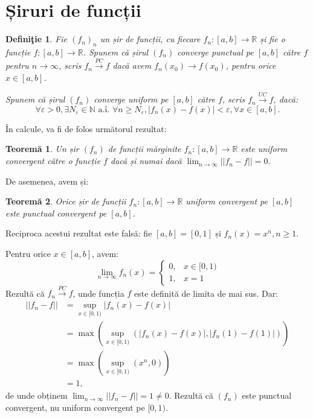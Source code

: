 \documentclass[11pt,a4paper]{article}
\newcommand\ds{\displaystyle}
\newcommand\xrar{\xrightarrow}
\newcommand\ai{\text{ a.\^{i}. }}
\newcommand\NN{\mathbb{N}}
\newcommand\RR{\mathbb{R}}
\theoremstyle{dotless}
\newtheorem{theorem}{Teorem\u{a}}[section]
\theoremstyle{dotlessdr}
\newtheorem{definition}{Defini\c{t}ie}[section]
\begin{document}

\section{Șiruri de funcții}
\label{sec:siruri-f}

\begin{definition}\label{def:pc-uc}
  Fie $(f_n)_n$ un șir de funcții, cu fiecare $f_n : [a, b] \to \RR$ și fie
  o funcție $f: [a, b] \to \RR$. Spunem că șirul $(f_n)$ \emph{converge punctual}
  pe $[a, b]$ către $f$ pentru $n \to \infty$, scris $f_n \xrar{PC} f$ dacă avem
  $f_n(x_0) \to f(x_0)$, pentru orice $x \in [a, b]$.

  Spunem că șirul $(f_n)$ \emph{converge uniform} pe $[a, b]$ către $f$, scris
  $f_n \xrar{UC} f$, dacă:
  \[
    \forall \varepsilon > 0, \exists N_\varepsilon \in \NN \ai %
    \forall n \geq N_\varepsilon, |f_n(x) - f(x)| < \varepsilon, \forall x \in [a, b].
  \]
\end{definition}

În calcule, va fi de folos următorul rezultat:

\begin{theorem}\label{thm:pc-uc}
  Un șir $(f_n)$ de funcții mărginite $f_n : [a, b] \to \RR$ este uniform convergent
  către o funcție $f$ dacă și numai dacă $\ds\lim_{n \to \infty} ||f_n - f|| = 0$.
\end{theorem}

De asemenea, avem și:
\begin{theorem}\label{thm:pc-uc-implica}
  Orice șir de funcții $f_n : [a, b] \to \RR$ uniform convergent pe $[a, b]$ este
  punctual convergent pe $[a, b]$.
\end{theorem}

Reciproca acestui rezultat este falsă: fie $[a, b] = [0, 1]$ și $f_n(x) = x^n, n \geq 1$.

Pentru orice $x \in [a, b]$, avem:
\[
  \lim_{n \to \infty} f_n(x) =
  \begin{cases}
    0, & x \in [0, 1) \\
    1, & x = 1
  \end{cases}
\]
Rezultă că $f_n \xrar{PC} f$, unde funcția $f$ este definită de limita de mai sus.
Dar:
\begin{align*}
  ||f_n - f|| &= \sup_{x \in [0, 1)} |f_n(x) - f(x)| \\
              &= \max (\sup_{x \in [0, 1)} (|f_n(x) - f(x)|, |f_n(1) - f(1)|)) \\
              &= \max (\sup_{x \in [0, 1)} (x^n, 0)) \\
              &= 1,
\end{align*}
de unde obținem $\ds\lim_{n \to \infty} ||f_n - f|| = 1 \neq 0$. Rezultă că
$(f_n)$ este punctual convergent, nu uniform convergent pe $[0, 1)$.
\end{document}
